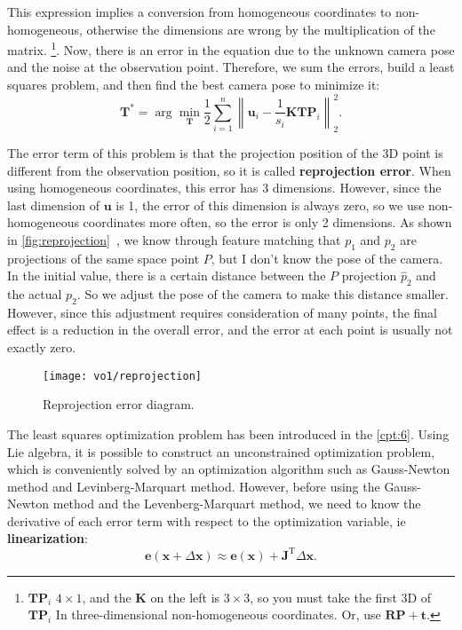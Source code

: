 This expression implies a conversion from homogeneous coordinates to non-homogeneous, otherwise the dimensions are wrong by the multiplication of the matrix. \footnote{ $ \bm{T} {\bm{P}_i}$ $4 \times 1$, and the $\bm{K}$ on the left is $3 \times 3$, so you must take the first 3D of $\bm{T}\bm{P}_i$ In three-dimensional non-homogeneous coordinates. Or, use $\bm{R}\bm{P}+\bm{t}$. }. Now, there is an error in the equation due to the unknown camera pose and the noise at the observation point. Therefore, we sum the errors, build a least squares problem, and then find the best camera pose to minimize it:
\begin{equation}
{\bm{T}^*} = \arg \mathop {\min }\limits_{\bm{T}} \frac{1}{2}\sum\limits_{i = 1}^n {\left\| {{{\bm{u}}_i} - \frac{1}{s_i} \bm{K}\bm{T}{\bm{P}}_i} \right\|_2^2} .
\end{equation}

The error term of this problem is that the projection position of the 3D point is different from the observation position, so it is called \textbf{reprojection error}. When using homogeneous coordinates, this error has 3 dimensions. However, since the last dimension of ${\bm{u}}$ is 1, the error of this dimension is always zero, so we use non-homogeneous coordinates more often, so the error is only 2 dimensions. As shown in \autoref{fig:reprojection}~, we know through feature matching that $p_1$ and $p_2$ are projections of the same space point $P$, but I don't know the pose of the camera. In the initial value, there is a certain distance between the $P$ projection $\hat{p}_2$ and the actual $p_2$. So we adjust the pose of the camera to make this distance smaller. However, since this adjustment requires consideration of many points, the final effect is a reduction in the overall error, and the error at each point is usually not exactly zero.

\begin{figure}[!htp]
\centering
\texttt{[image: vo1/reprojection]}
\caption{Reprojection error diagram. }
\label{fig:reprojection}
\end{figure}

The least squares optimization problem has been introduced in the \ref{cpt:6}. Using Lie algebra, it is possible to construct an unconstrained optimization problem, which is conveniently solved by an optimization algorithm such as Gauss-Newton method and Levinberg-Marquart method. However, before using the Gauss-Newton method and the Levenberg-Marquart method, we need to know the derivative of each error term with respect to the optimization variable, ie \textbf{linearization}:
\begin{equation}
\bm{e}( \bm{x} + \Delta \bm{x} ) \approx \bm{e}(\bm{x}) + \bm{J} ^\mathrm{T}\Delta \bm {x}.
\end{equation}

